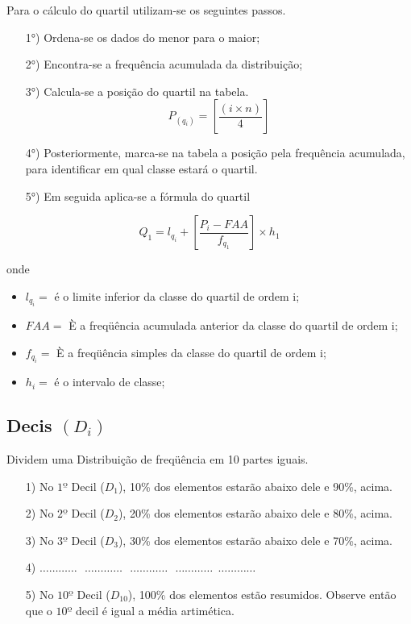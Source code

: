 Para o cálculo do quartil utilizam-se os seguintes passos.



\begin{enumerate}

\item [{1°)}] Ordena-se os dados do menor para o maior;
\item [{2°)}] Encontra-se a frequência acumulada da distribuição;
\item [{3°)}]Calcula-se a posição do quartil na tabela.
$$ P_{(q_{i})} = \left[ \frac{(i \times n)}{4}  \right] $$
\item [{4°)}] Posteriormente, marca-se na tabela a posição pela frequência acumulada, para identificar em qual classe estará o quartil.
\item [{5°)}] Em seguida aplica-se a fórmula do quartil
\end{enumerate}

\begin{equation}\label{}
    Q_{1}= l_{q_{i}}+\left[\frac{P_{i}-FAA}{f_{q_{1}}}\right]\times h_{1}
\end{equation}

 onde

 \begin{itemize}
   \item $l_{q_{i}}=$ é o limite inferior da classe do quartil de ordem i;
   \item $FAA=$ È a freqüência acumulada anterior da classe do quartil de ordem i;
   \item $f_{q_{i}}=$ È a freqüência simples da classe do quartil de ordem i;
   \item $h_{i}=$ é o intervalo de classe;
 \end{itemize}




\subsection{Decis $(D_{i})$}

Dividem uma Distribuição de freqüência em 10 partes iguais.


\begin{enumerate}
  \item[{1)}] No $1º$ Decil ($D_{1}$), 10\% dos elementos estarão abaixo dele e 90\%, acima.
  \item[{2)}] No $2º$ Decil ($D_{2}$), 20\% dos elementos estarão abaixo dele e 80\%, acima.
  \item[{3)}] No $3º$ Decil ($D_{3}$), 30\% dos elementos estarão abaixo dele e 70\%, acima.
  \item[{4)}] $\ldots \ldots \ldots \ldots \ \ \  \ldots \ldots \ldots \ldots \ \ \  \ldots \ldots \ldots \ldots \ \ \  \ldots \ldots \ldots \ldots \ \ \ldots \ldots \ldots \ldots$
 \item[{5)}] No $10º$ Decil ($D_{10}$), 100\% dos elementos estão resumidos. Observe então que o $10º$ decil é igual a média artimética.
\end{enumerate}

